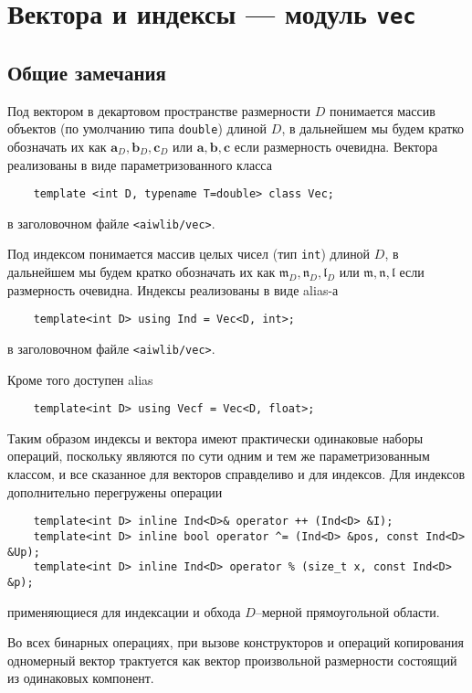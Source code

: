 \def\Ind#1{\mathfrak{#1}}
\def\l{\Ind{l}}
\def\m{\Ind{m}}
\def\n{\Ind{n}}
\def\Vec#1{\mathbf{#1}}
\def\a{\Vec{a}}
\def\b{\Vec{b}}
\def\c{\Vec{c}}


\section{Вектора и индексы --- модуль {\tt vec}}\label{vec:sec}
\subsection{Общие замечания}
 Под вектором в декартовом пространстве размерности $D$ понимается массив объектов
(по умолчанию типа {\tt double}) длиной $D$, в
дальнейшем мы будем кратко обозначать их как $\a_D, \b_D, \c_D$ или $\a, \b,
\c$ если размерность очевидна.
Вектора реализованы в виде
параметризованного класса 
\begin{verbatim}
	template <int D, typename T=double> class Vec;
\end{verbatim}
в заголовочном файле {\tt <aiwlib/vec>}.

Под индексом понимается массив целых чисел (тип {\tt int}) длиной $D$, в
дальнейшем мы будем кратко обозначать их как $\m_D, \n_D, \l_D$ или $\m, \n,
\l$ если размерность очевидна. Индексы реализованы в виде alias-а
\begin{verbatim}
	template<int D> using Ind = Vec<D, int>;
\end{verbatim}
в заголовочном файле {\tt <aiwlib/vec>}.

Кроме того доступен alias
\begin{verbatim}
	template<int D> using Vecf = Vec<D, float>;
\end{verbatim}

Таким образом индексы и вектора имеют практически одинаковые наборы операций, поскольку 
являются по сути одним и тем же параметризованным классом, и все сказанное для векторов справделиво и для индексов.
Для индексов дополнительно перегружены операции
\begin{verbatim}
	template<int D> inline Ind<D>& operator ++ (Ind<D> &I);
	template<int D> inline bool operator ^= (Ind<D> &pos, const Ind<D> &Up);
	template<int D> inline Ind<D> operator % (size_t x, const Ind<D> &p);
\end{verbatim}
применяющиеся для индексации и обхода $D$--мерной прямоугольной области.

Во всех бинарных операциях, при вызове конструкторов и операций копирования 
одномерный вектор трактуется как вектор произвольной размерности состоящий из одинаковых компонент.

